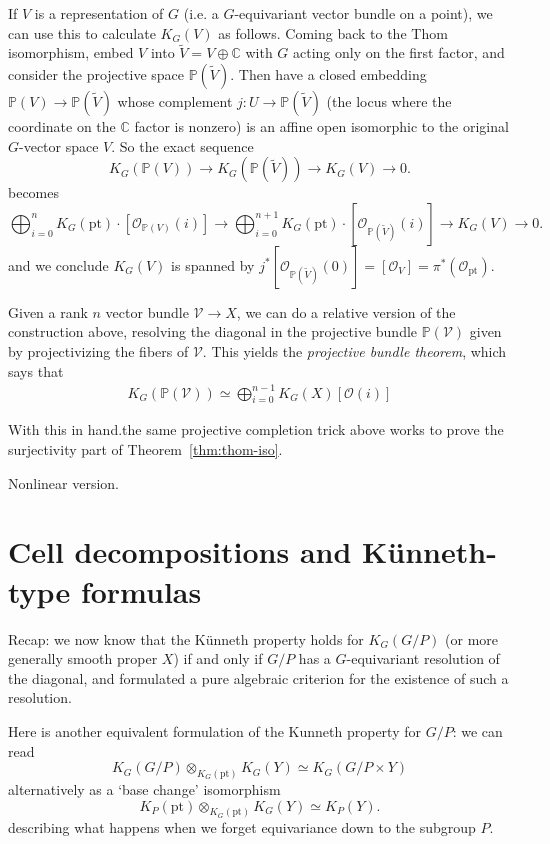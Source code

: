 \documentclass[11pt]{amsart}
\theoremstyle{definition}
\newcommand{\bP}{\mathbb{P}}
\newcommand{\Oc}{\mathcal{O}}
\numberwithin{equation}{subsection}
\numberwithin{figure}{subsection}
\newcommand{\pt}{\mathrm{pt}}
\newcommand{\blue}[1]{{\color{blue}#1}}
\begin{document}
If $V$ is a representation of $G$ (i.e. a $G$-equivariant vector bundle on a point), we can use this to calculate $K_G(V)$ as follows. Coming back to the Thom isomorphism, embed $V$ into $\widetilde{V} = V\oplus \mathbb{C}$ with $G$ acting only on the first factor, and consider the projective space $\mathbb{P}(\widetilde{V})$. Then have a closed embedding $\mathbb{P}(V)\rightarrow\bP(\widetilde{V})$ whose complement $j:U\rightarrow \bP(\widetilde{V})$ (the locus where the coordinate on the $\mathbb{C}$ factor is nonzero) is an affine open isomorphic to the original $G$-vector space $V$. So the exact sequence
$$
K_G(\bP(V))\rightarrow K_G(\bP(\widetilde V))\rightarrow K_G(V)\rightarrow 0.
$$
becomes
$$
\bigoplus_{i=0}^n K_G(\pt)\cdot [\mathcal{O}_{\bP(V)}(i)] \rightarrow \bigoplus_{i=0}^{n+1} K_G(\pt)\cdot [\mathcal{O}_{\bP(\widetilde V)}(i)]\rightarrow K_G(V)\rightarrow 0.
$$
and we conclude $K_G(V)$ is spanned by $j^*[\mathcal{O}_{\bP(\widetilde V)}(0)]=[\mathcal{O}_V]=\pi^*(\Oc_\pt)$. 

Given a rank $n$ vector bundle $\mathcal{V}\rightarrow X$, we can do a relative version of the construction above, resolving the diagonal in the projective bundle $\bP(\mathcal{V})$ given by projectivizing the fibers of $\mathcal{V}$. This yields the \emph{projective bundle theorem}, which says that
\begin{align}
\label{eq:projective-bundle}
K_G(\bP(\mathcal{V}))\simeq \bigoplus_{i=0}^{n-1}K_G(X)[\Oc(i)]
\end{align}

With this in hand.the same projective completion trick above works to prove the surjectivity part of Theorem~\ref{thm:thom-iso}.


\blue{Nonlinear version.}

\section{Cell decompositions and K\"unneth-type formulas}
Recap: we now know that the K\"unneth property holds for $K_G(G/P)$ (or more generally smooth proper $X$) if and only if $G/P$  has a $G$-equivariant resolution of the diagonal, and formulated a pure algebraic criterion for the existence of such a resolution. 

Here is another equivalent formulation of the Kunneth property for $G/P$: we can read
$$
K_G(G/P)\otimes_{K_G(\pt)}K_G(Y)\simeq K_G(G/P\times Y)
$$
alternatively as a `base change' isomorphism
$$
K_P(\pt)\otimes_{K_G(\pt)}K_G(Y)\simeq K_P(Y).
$$
describing what happens when we forget equivariance down to the subgroup $P$.
\end{document}
